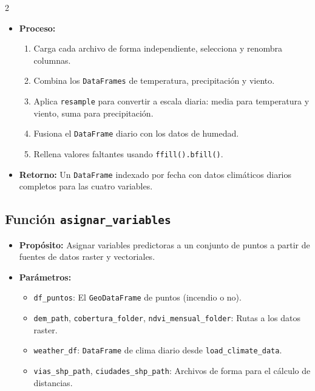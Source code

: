 \documentclass[a4paper,10pt]{article}
\begin{document}
\begin{multicols}{2}
\begin{itemize}
    \item \textbf{Proceso:}
    \begin{enumerate}
        \item Carga cada archivo de forma independiente, selecciona y renombra columnas.
        \item Combina los \texttt{DataFrames} de temperatura, precipitación y viento.
        \item Aplica \texttt{resample} para convertir a escala diaria: media para temperatura y viento, suma para precipitación.
        \item Fusiona el \texttt{DataFrame} diario con los datos de humedad.
        \item Rellena valores faltantes usando \texttt{ffill().bfill()}.
    \end{enumerate}

    \item \textbf{Retorno:} Un \texttt{DataFrame} indexado por fecha con datos climáticos diarios completos para las cuatro variables.
\end{itemize}

\subsection{Función \texttt{asignar\_variables}}

\begin{itemize}
    \item \textbf{Propósito:} Asignar variables predictoras a un conjunto de puntos a partir de fuentes de datos raster y vectoriales.

    \item \textbf{Parámetros:}
    \begin{itemize}
        \item \texttt{df\_puntos}: El \texttt{GeoDataFrame} de puntos (incendio o no).
        \item \texttt{dem\_path}, \texttt{cobertura\_folder}, \texttt{ndvi\_mensual\_folder}: Rutas a los datos raster.
        \item \texttt{weather\_df}: \texttt{DataFrame} de clima diario desde \texttt{load\_climate\_data}.
        \item \texttt{vias\_shp\_path}, \texttt{ciudades\_shp\_path}: Archivos de forma para el cálculo de distancias.
    \end{itemize}


\end{itemize}
\end{multicols}
\end{document}

